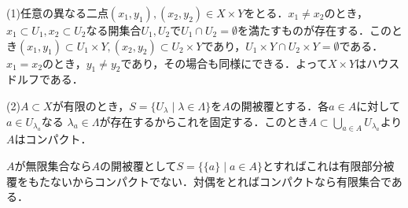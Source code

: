 \documentclass[
		book,
		head_space=20mm,
		foot_space=20mm,
		gutter=10mm,
		line_length=190mm
]{jlreq}
\begin{document}
(1)任意の異なる二点$(x_1,y_1),(x_2,y_2) \in X \times Y$をとる．$x_1 \neq x_2$のとき，$x_1 \subset U_1 ,x_2 \subset U_2$なる開集合$U_1,U_2$で$U_1 \cap U_2=\emptyset$を満たすものが存在する．このとき$(x_1,y_1)\subset U_1 \times Y,(x_2,y_2) \subset U_2 \times Y$であり，$U_1 \times Y \cap U_2 \times Y=\emptyset$である．$x_1=x_2$のとき，$y_1 \neq y_2$であり，その場合も同様にできる．よって$X \times Y$はハウスドルフである．

(2)$A \subset X$が有限のとき，$S=\{ U_\lambda\mid \lambda\in \Lambda\}$を$A$の開被覆とする．各$a \in A$に対して$a \in U_{\lambda_a}$なる $ \lambda_a \in \Lambda$が存在するからこれを固定する．このとき$A \subset \bigcup\limits_{a \in A }U_{\lambda_a}$より$A$はコンパクト．

$A$が無限集合なら$A$の開被覆として$S=\{ \{a\} \mid a \in A\}$とすればこれは有限部分被覆をもたないからコンパクトでない．対偶をとればコンパクトなら有限集合である．
\end{document}
